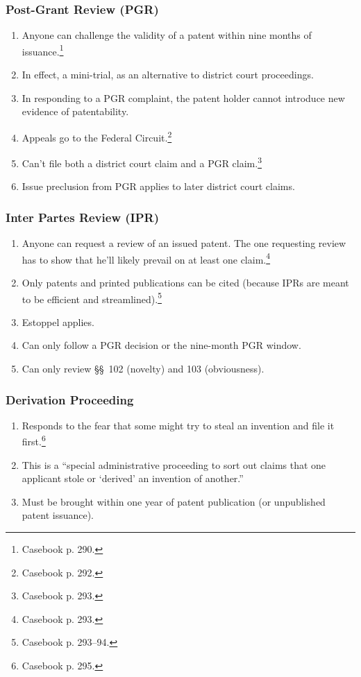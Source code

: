 \subsubsection{Post-Grant Review (PGR)}

\begin{enumerate}
    \item Anyone can challenge the validity of a patent within nine months of 
    issuance.\footnote{Casebook p. 290.}
    \item In effect, a mini-trial, as an alternative to district court 
    proceedings.
    \item In responding to a PGR complaint, the patent holder cannot introduce 
    new evidence of patentability.
    \item Appeals go to the Federal Circuit.\footnote{Casebook p. 292.}
    \item Can't file both a district court claim and a PGR 
    claim.\footnote{Casebook p. 293.}
    \item Issue preclusion from PGR applies to later district court 
    claims.
\end{enumerate}

\subsubsection{Inter Partes Review (IPR)}

\begin{enumerate}
    \item Anyone can request a review of an issued patent. The one requesting 
    review has to show that he'll likely prevail on at least one 
    claim.\footnote{Casebook p. 293.}
    \item Only patents and printed publications can be cited (because IPRs are 
    meant to be efficient and streamlined).\footnote{Casebook p. 293--94.}
    \item Estoppel applies.
    \item Can only follow a PGR decision or the nine-month PGR window.
    \item Can only review \S\S\ 102 (novelty) and 103 (obviousness).
\end{enumerate}

\subsubsection{Derivation Proceeding}

\begin{enumerate}
    \item Responds to the fear that some might try to steal an invention and 
    file it first.\footnote{Casebook p. 295.}
    \item This is a ``special administrative proceeding to sort out claims that 
    one applicant stole or `derived' an invention of another.''
    \item Must be brought within one year of patent publication (or unpublished 
    patent issuance).
\end{enumerate}

